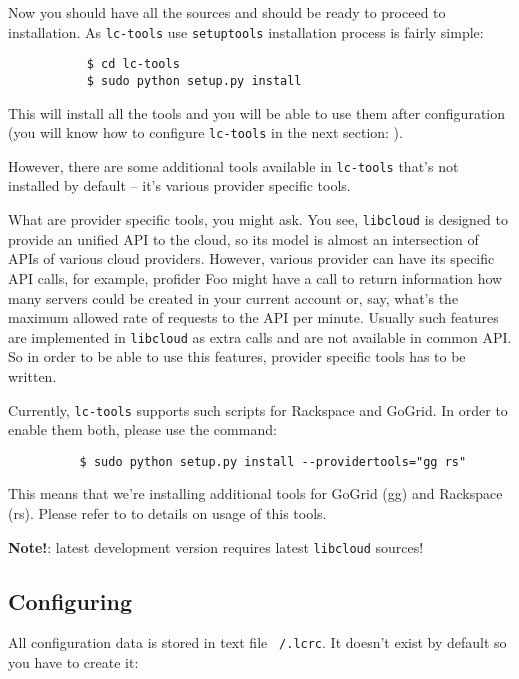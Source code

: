 \documentclass[a4paper]{report}
\begin{document}
          Now you should have all the sources and should be ready to proceed to
          installation. As {\tt lc-tools} use {\tt setuptools} installation
          process is fairly simple:

          \begin{verbatim}
           $ cd lc-tools
           $ sudo python setup.py install
           \end{verbatim}

         This will install all the tools and you will be able to use them
         after configuration (you will know how to configure {\tt lc-tools}
         in the next section: ).

         However, there are some additional tools available in {\tt lc-tools}
         that's not installed by default -- it's various provider specific tools.
         
         What are provider specific tools, you might ask. You see, {\tt libcloud}
         is designed to provide an unified API to the cloud, so its model is almost
         an intersection of APIs of various cloud providers. However, various
         provider can have its specific API calls, for example, profider Foo might
         have a call to return information how many servers could be created in
         your current account or, say, what's the maximum allowed rate of requests
         to the API per minute. Usually such features are implemented in {\tt libcloud}
         as extra calls and are not available in common API. So in order to be able
         to use this features, provider specific tools has to be written.

         Currently, {\tt lc-tools} supports such scripts for Rackspace and GoGrid.
         In order to enable them both, please use the command:

         \begin{verbatim}
          $ sudo python setup.py install --providertools="gg rs"
          \end{verbatim}

         This means that we're installing additional tools for GoGrid (gg) and
         Rackspace (rs). Please refer to  to details on usage
         of this tools.


         \textbf{Note!}: latest development version requires latest {\tt libcloud}
         sources!
      \subsection{Configuring} \label{conf}
      All configuration data is stored in text file {\tt ~/.lcrc}. It doesn't exist
      by default so you have to create it:
\end{document}

